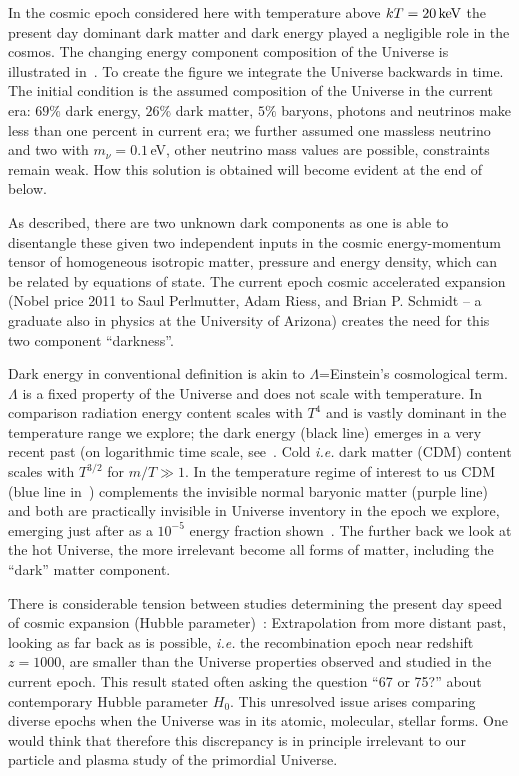 In the cosmic epoch considered here with temperature above $kT=20\text{\,keV}$ the present day dominant dark matter and dark energy played a negligible role in the cosmos. The changing energy component composition of the Universe is illustrated in~. To create the figure we integrate the Universe backwards in time. The initial condition is the assumed composition of the Universe in the current era: $69\%$ dark energy, $26\%$ dark matter, $5\%$ baryons, photons and neutrinos make less than one percent in current era; we further assumed one massless neutrino and two with $m_\nu=0.1$\,eV, other neutrino mass values are possible, constraints remain weak. How this solution is obtained will become evident at the end of~ below. 

As described, there are two unknown dark components as one is able to disentangle these given two independent inputs in the cosmic energy-momentum tensor of homogeneous isotropic matter, pressure and energy density, which can be related by equations of state. The current epoch cosmic accelerated expansion (Nobel price 2011 to Saul Perlmutter, Adam Riess, and Brian P. Schmidt -- a graduate also in physics at the University of Arizona) creates the need for this two component ``darkness''.

Dark energy in conventional definition is akin to $\Lambda$=Einstein's cosmological term. $\Lambda$ is a fixed property of the Universe and does not scale with temperature. In comparison radiation energy content scales with $T^4$ and is vastly dominant in the temperature range we explore; the dark energy (black line) emerges in a very recent past (on logarithmic time scale, see~. Cold {\it i.e.\/} dark matter (CDM) content scales with $T^{3/2}$ for $m/T\gg 1$. In the temperature regime of interest to us CDM (blue line in~) complements the invisible normal baryonic matter (purple line) and both are practically invisible in Universe inventory in the epoch we explore, emerging just after as a $10^{-5}$ energy fraction shown~. The further back we look at the hot Universe, the more irrelevant become all forms of matter, including the ``dark'' matter component. 

There is considerable tension between studies determining the present day speed of cosmic expansion (Hubble parameter)~\cite{DiValentino:2024spr,DiValentino:2021izs}: Extrapolation from more distant past, looking as far back as is possible, {\it i.e.\/} the recombination epoch near redshift $z=1000$, are smaller than the Universe properties observed and studied in the current epoch. This result stated often asking the question ``67 or 75?'' about contemporary Hubble parameter $H_0$. This unresolved issue arises comparing diverse epochs when the Universe was in its atomic, molecular, stellar forms. One would think that therefore this discrepancy is in principle irrelevant to our particle and plasma study of the primordial Universe. 

